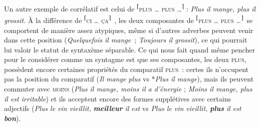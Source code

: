 {    Un autre exemple de corrélatif est celui de \textrm{\textsuperscript{⌈}}\textsc{plus} \textsc{…} \textsc{plus} \textsc{…}\textrm{\textsuperscript{⌉}} : \textit{Plus il mange, plus il grossit}. À la différence de \textrm{\textsuperscript{⌈}}\textsc{ci} \textsc{…} \textsc{ça}\textrm{\textsuperscript{⌉}}~, les deux composantes de \textrm{\textsuperscript{⌈}}\textsc{plus} \textsc{…} \textsc{plus} \textsc{…}\textrm{\textsuperscript{⌉}}~se comportent de manière assez atypiques, même si d’autres adverbes peuvent venir dans cette position (\textit{Quelquefois il mange~}; \textit{Toujours il grossit}), ce qui pourrait lui valoir le statut de syntaxème séparable. Ce qui nous fait quand même pencher pour le considérer comme un syntagme est que ses composantes, les deux \textsc{plus}, possèdent encore certaines propriétés du comparatif \textsc{plus~}: certes ils n’occupent pas la position du comparatif (\textit{Il mange plus} vs *\textit{Plus il mange}), mais ils peuvent commuter avec \textsc{moins} (\textit{Plus il mange, moins il a d’énergie} ; \textit{Moins il mange, plus il est irritable}) et ils acceptent encore des formes supplétives avec certains adjectifs (\textit{Plus le vin vieillit,} \textbf{\textit{meilleur}} \textit{il est} vs \textit{Plus le vin vieillit,} \textbf{\textit{plus}} \textit{il est} \textbf{\textit{bon}}).
}

